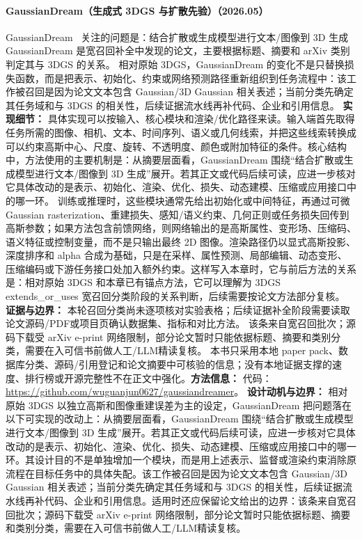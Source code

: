 \paragraph{GaussianDream（生成式 3DGS 与扩散先验）（2026.05）}
GaussianDream~\cite{2605_20752} 关注的问题是：结合扩散或生成模型进行文本/图像到 3D 生成 GaussianDream 是宽召回补全中发现的论文，主要根据标题、摘要和 arXiv 类别判定其与 3DGS 的关系。
相对原始 3DGS，GaussianDream 的变化不是只替换损失函数，而是把表示、初始化、约束或网络预测路径重新组织到任务流程中：该工作被召回是因为论文文本包含 Gaussian/3D Gaussian 相关表述；当前分类先确定其任务域和与 3DGS 的相关性，后续证据流水线再补代码、企业和引用信息。
\textbf{实现细节：} 具体实现可以按输入、核心模块和渲染/优化路径来读。输入端首先取得任务所需的图像、相机、文本、时间序列、语义或几何线索，并把这些线索转换成可以约束高斯中心、尺度、旋转、不透明度、颜色或附加特征的条件。核心结构中，方法使用的主要机制是：从摘要层面看，GaussianDream 围绕“结合扩散或生成模型进行文本/图像到 3D 生成”展开。若其正文或代码后续可读，应进一步核对它具体改动的是表示、初始化、渲染、优化、损失、动态建模、压缩或应用接口中的哪一环。 训练或推理时，这些模块通常先给出初始化或中间特征，再通过可微 Gaussian rasterization、重建损失、感知/语义约束、几何正则或任务损失回传到高斯参数；如果方法包含前馈网络，则网络输出的是高斯属性、变形场、压缩码、语义特征或控制变量，而不是只输出最终 2D 图像。渲染路径仍以显式高斯投影、深度排序和 alpha 合成为基础，只是在采样、属性预测、局部编辑、动态变形、压缩编码或下游任务接口处加入额外约束。这样写入本章时，它与前后方法的关系是：相对原始 3DGS 和本章已有锚点方法，它可以理解为 3DGS extends\_or\_uses 宽召回分类阶段的关系判断，后续需要按论文方法部分复核。
\textbf{证据与边界：} 本轮召回分类尚未逐项核对实验表格；后续证据补全阶段需要读取论文源码/PDF或项目页确认数据集、指标和对比方法。 该条来自宽召回批次；源码下载受 arXiv e-print 网络限制，部分论文暂时只能依据标题、摘要和类别分类，需要在入可信书前做人工/LLM精读复核。 本书只采用本地 paper pack、数据库分类、源码/引用登记和论文摘要中可核验的信息；没有本地证据支撑的速度、排行榜或开源完整性不在正文中强化。\textbf{方法信息：} 代码：\url{https://github.com/wuguanjun0627/gaussiandreamer}。
\textbf{设计动机与边界：} 相对原始 3DGS 以独立高斯和图像重建误差为主的设定，GaussianDream 把问题落在以下可实现的改动上：从摘要层面看，GaussianDream 围绕“结合扩散或生成模型进行文本/图像到 3D 生成”展开。若其正文或代码后续可读，应进一步核对它具体改动的是表示、初始化、渲染、优化、损失、动态建模、压缩或应用接口中的哪一环。其设计目的不是单独增加一个模块，而是用上述表示、监督或渲染约束消除原流程在目标任务中的具体失配。该工作被召回是因为论文文本包含 Gaussian/3D Gaussian 相关表述；当前分类先确定其任务域和与 3DGS 的相关性，后续证据流水线再补代码、企业和引用信息。适用时还应保留论文给出的边界：该条来自宽召回批次；源码下载受 arXiv e-print 网络限制，部分论文暂时只能依据标题、摘要和类别分类，需要在入可信书前做人工/LLM精读复核。
